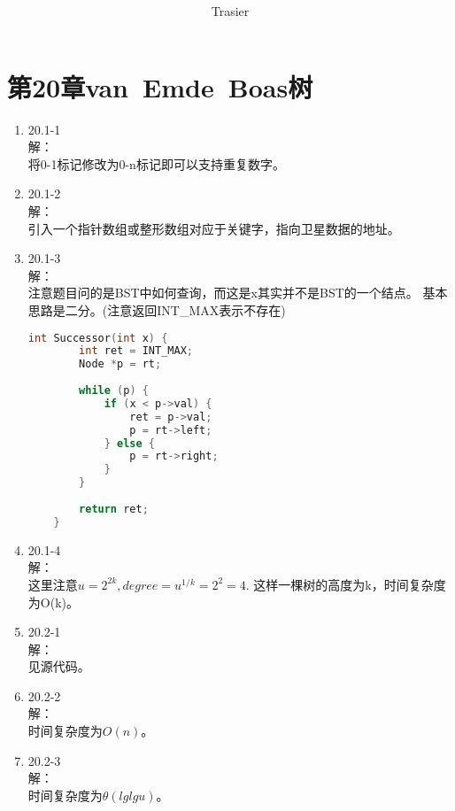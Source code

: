 \documentclass[UTF8]{ctexart}
\begin{document}
\title{\\}
\vspace{2cm}
\author{\Large Trasier}
\date{}
\maketitle

\section*{第20章\quad van\ Emde\ Boas树}
\begin{enumerate}
    \item 20.1-1 \\
    解：\\
	将0-1标记修改为0-n标记即可以支持重复数字。
	
	\item 20.1-2 \\
	解：\\
	引入一个指针数组或整形数组对应于关键字，指向卫星数据的地址。
	
	\item 20.1-3 \\
	解：\\
	注意题目问的是BST中如何查询，而这是x其实并不是BST的一个结点。
	基本思路是二分。(注意返回INT\_MAX表示不存在)
	\begin{lstlisting}[language=C++]
	int Successor(int x) {
		int ret = INT_MAX;
		Node *p = rt;
		
		while (p) {
			if (x < p->val) {
				ret = p->val;
				p = rt->left;
			} else {
				p = rt->right;
			}
		}
		
		return ret;
	}
	\end{lstlisting}
	
	\item 20.1-4 \\
	解：\\
	这里注意$u=2^{2k}, degree = u^{1/k} = 2^2 = 4$.
	这样一棵树的高度为k，时间复杂度为O(k)。
	
	\item 20.2-1 \\
	解：\\
	见源代码。
	
	\item 20.2-2 \\
	解：\\
	时间复杂度为$O(n)$。
	
	\item 20.2-3 \\
	解：\\
	时间复杂度为$\theta (lglgu)$。
	

\end{enumerate}
\end{document}
